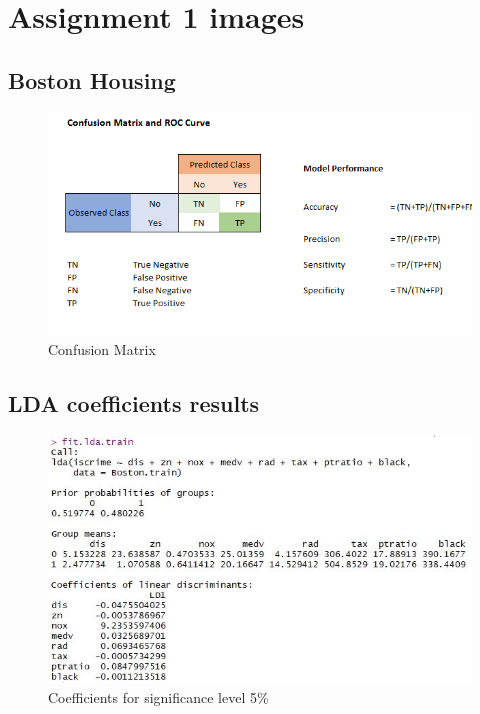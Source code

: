 
\section{Assignment 1 images}
\subsection{Boston Housing}
\label{app:boston_housing}

\begin{figure}[H]
\centering
\includegraphics[scale=0.55]{Graphics/Assignment1/ConfusionMatrix.png}
\caption{Confusion Matrix}
\label{fig:confusion_Matrix}
\end{figure}

\subsection{LDA coefficients results}
\begin{figure}[H]
\centering
\includegraphics[scale=0.55]{Graphics/Assignment1/LDACoefficients_005.JPG}
\caption{Coefficients for significance level 5\%}
\label{fig:coefficients_method_005}
\end{figure}

